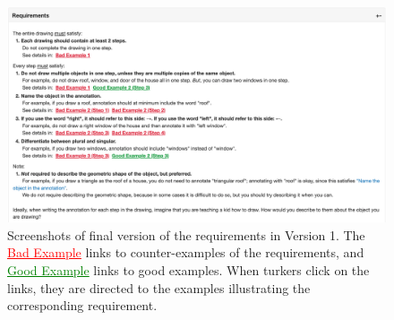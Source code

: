 \begin{figure}[!htb]
\includegraphics[width=\linewidth]{data_collection/v1_requirement.png}  
\caption{Screenshots of final version of the requirements in Version 1. The \textcolor{red}{\underline{Bad Example}} links to counter-examples of the requirements, and \textcolor{green}{\underline{Good Example}} links to good examples. When turkers click on the links, they are directed to the examples illustrating the corresponding requirement.}
\label{v1.requirement}
\end{figure}

